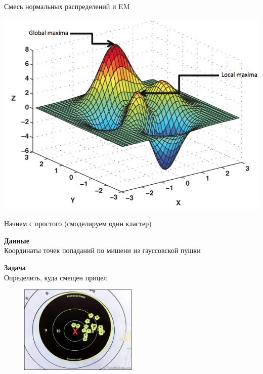 \documentclass[aspectratio=169]{beamer}
\begin{document}
\begin{frame}{}

\begin{center}
{\LARGE Смесь нормальных распределений и EM}

\vspace{2em}
\includegraphics[scale=0.3]{images/local.png}
\end{center}

\end{frame}

\begin{frame}{Начнем с простого (смоделируем один кластер)}

{\bf Данные} \\ Координаты точек попаданий по мишени из гауссовской пушки 

{\bf Задача} \\ Определить, куда смещен прицел

\begin{figure}
	\centering
	 \includegraphics[width=0.5\textwidth]{images/target.jpg}       
\end{figure}

\end{frame}
\end{document}
